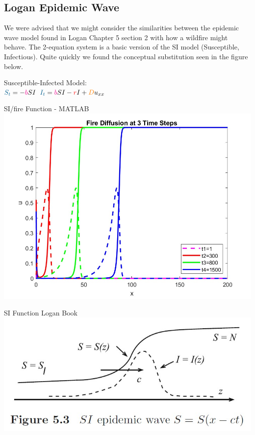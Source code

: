 \documentclass{article}
\begin{document}
\subsection{Logan\supercite{logan} Epidemic Wave}
We were advised that we might consider the similarities between the epidemic wave model found in Logan Chapter 5 section 2 with how a wildfire might behave\supercite{logan}.  The 2-equation system is a basic version of the SI model (Susceptible, Infectious).  Quite quickly we found the conceptual substitution seen in the figure below.
\begin{center}
    {\large  Susceptible-Infected Model:\\
    $\textcolor{MidnightBlue}{S_t} = -\textcolor{magenta}{b}SI$\qquad
    $\textcolor{MidnightBlue}{I_t} = \textcolor{magenta}{b}SI-\textcolor{red}{r}I+\textcolor{orange}{D}u_{xx}$}\\
    \begin{minipage}[t]{.49\textwidth}
    \centering
    SI/fire Function - MATLAB    
    \includegraphics[scale=0.17]{Step1_HS_Gaussian_Advection_Diffusion_3_timestamps.jpg}
    \end{minipage}
    \hfill
    \begin{minipage}[t]{.49\textwidth}
    \centering
    SI Function Logan Book    
    \includegraphics[scale=0.5]{1D_epidemic_from_book.jpg}

\end{minipage}
\end{center}
\end{document}
